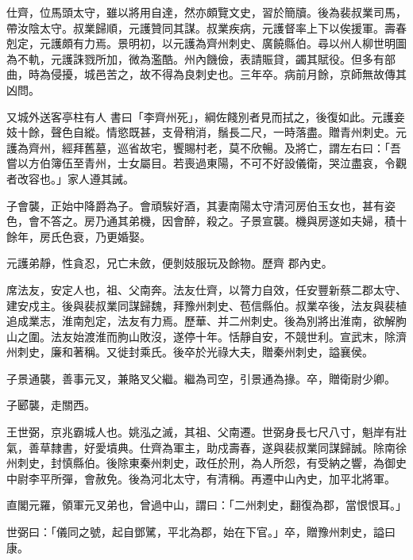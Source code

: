 \begin{pinyinscope}
 仕齊，位馬頭太守，雖以將用自達，然亦頗覽文史，習於簡牘。後為裴叔業司馬，帶汝陰太守。叔業歸順，元護贊同其謀。叔業疾病，元護督率上下以俟援軍。壽春剋定，元護頗有力焉。景明初，以元護為齊州刺史、廣饒縣伯。尋以州人柳世明圖為不軌，元護誅戮所加，微為濫酷。州內饑儉，表請賑貸，蠲其賦役。但多有部曲，時為侵擾，城邑苦之，故不得為良刺史也。三年卒。病前月餘，京師無故傳其凶問。



 又城外送客亭柱有人
 書曰「李齊州死」，綱佐餞別者見而拭之，後復如此。元護妾妓十餘，聲色自縱。情慾既甚，支骨稍消，鬚長二尺，一時落盡。贈青州刺史。元護為齊州，經拜舊墓，巡省故宅，饗賜村老，莫不欣暢。及將亡，謂左右曰：「吾嘗以方伯簿伍至青州，士女屬目。若喪過東陽，不可不好設儀衛，哭泣盡哀，令觀者改容也。」家人遵其誡。



 子會襲，正始中降爵為子。會頑騃好酒，其妻南陽太守清河房伯玉女也，甚有姿色，會不答之。房乃通其弟機，因會醉，殺之。子景宣襲。機與房遂如夫婦，積十餘年，房氏色衰，乃更婚娶。



 元護弟靜，性貪忍，兄亡未斂，便剝妓服玩及餘物。歷齊
 郡內史。



 席法友，安定人也，祖、父南奔。法友仕齊，以膂力自效，任安豐新蔡二郡太守、建安戍主。後與裴叔業同謀歸魏，拜豫州刺史、苞信縣伯。叔業卒後，法友與裴植追成業志，淮南剋定，法友有力焉。歷華、并二州刺史。後為別將出淮南，欲解朐山之圍。法友始渡淮而朐山敗沒，遂停十年。恬靜自安，不競世利。宣武末，除濟州刺史，廉和著稱。又徙封乘氏。後卒於光祿大夫，贈秦州刺史，謚襄侯。



 子景通襲，善事元叉，兼賂叉父繼。繼為司空，引景通為掾。卒，贈衛尉少卿。



 子郾襲，走關西。



 王世弼，京兆霸城人也。姚泓之滅，其祖、父南遷。世弼身長七尺八寸，魁岸有壯氣，善草隸書，好愛墳典。仕齊為軍主，助戍壽春，遂與裴叔業同謀歸誠。除南徐州刺史，封慎縣伯。後除東秦州刺史，政任於刑，為人所怨，有受納之響，為御史中尉李平所彈，會赦免。後為河北太守，有清稱。再遷中山內史，加平北將軍。



 直閣元羅，領軍元叉弟也，曾過中山，謂曰：「二州刺史，翻復為郡，當恨恨耳。」



 世弼曰：「儀同之號，起自鄧騭，平北為郡，始在下官。」卒，贈豫州刺史，謚曰康。




\end{pinyinscope}
